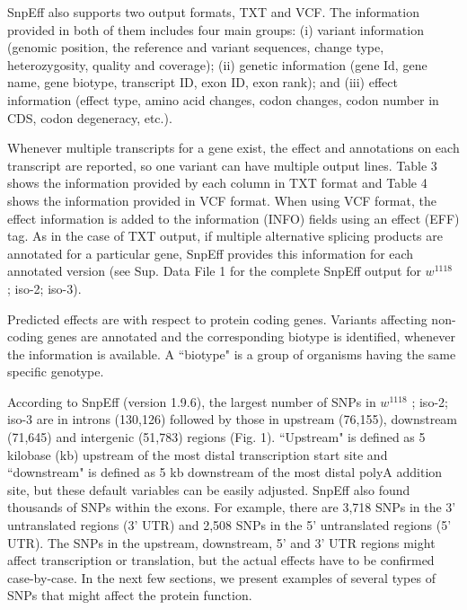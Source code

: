 SnpEff also supports two output formats, TXT and VCF. The information provided in both of them includes four main groups: (i) variant information (genomic position, the reference and variant sequences, change type, heterozygosity, quality and coverage); (ii) genetic information (gene Id, gene name, gene biotype, transcript ID, exon ID, exon rank); and (iii) effect information (effect type, amino acid changes, codon changes, codon number in CDS, codon degeneracy, etc.).

Whenever multiple transcripts for a gene exist, the effect and annotations on each transcript are reported, so one variant can have multiple output lines. Table 3 shows the information provided by each column in TXT format and Table 4 shows the information provided in VCF format. When using VCF format, the effect information is added to the information (INFO) fields using an effect (EFF) tag. As in the case of TXT output, if multiple alternative splicing products are annotated for a particular gene, SnpEff provides this information for each annotated version (see Sup. Data File 1 for the complete SnpEff output for $w^{1118}$ ; iso-2; iso-3).

Predicted effects are with respect to protein coding genes.  Variants affecting non-coding genes are annotated and the corresponding biotype is identified, whenever the information is available. A ``biotype" is a group of organisms having the same specific genotype.

According to SnpEff (version 1.9.6), the largest number of SNPs in $w^{1118}$ ; iso-2; iso-3 are in introns (130,126) followed by those in upstream (76,155), downstream (71,645) and intergenic (51,783) regions (Fig. 1). ``Upstream" is defined as 5 kilobase (kb) upstream of the most distal transcription start site and ``downstream" is defined as 5 kb downstream of the most distal polyA addition site, but these default variables can be easily adjusted.  SnpEff also found thousands of SNPs within the exons. For example, there are 3,718 SNPs in the 3' untranslated regions (3' UTR) and 2,508 SNPs in the 5' untranslated regions (5' UTR).  The SNPs in the upstream, downstream, 5' and 3' UTR regions might affect transcription or translation, but the actual effects have to be confirmed case-by-case. In the next few sections, we present examples of several types of SNPs that might affect the protein function.

